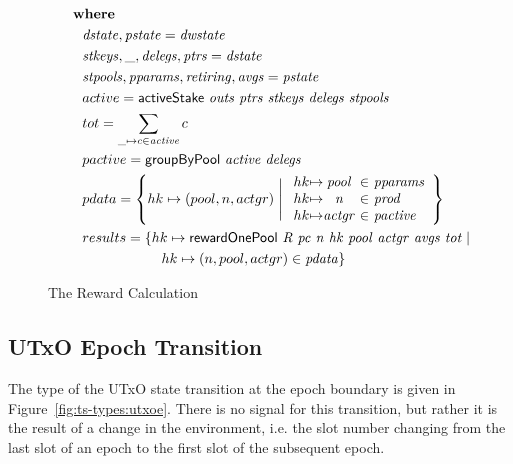 \begin{figure}[htb]
\begin{align*}
      & ~~~\where \\
      & ~~~~~~~\var{dstate},\var{pstate} = \var{dwstate} \\
      & ~~~~~~~\var{stkeys},\_,\var{delegs},\var{ptrs} = \var{dstate} \\
      & ~~~~~~~\var{stpools},\var{pparams},\var{retiring},\var{avgs} = \var{pstate} \\
      & ~~~~~~~active = \activeStake{outs}{ptrs}{stkeys}{delegs}{stpools} \\
      & ~~~~~~~tot = \sum_{\_\mapsto c\in \var{active}}c \\
      & ~~~~~~~pactive = \fun{groupByPool}~\var{active}~\var{delegs} \\
      & ~~~~~~~pdata = \left\{
                         hk\mapsto (pool, n, actgr)  \mathrel{\Bigg|}
                          \begin{array}{r@{\mapsto}c@{~\in~}l}
                          hk & \var{pool} & \var{pparams} \\
                          hk & \var{n} & \var{prod} \\
                          hk & \var{actgr} & \var{pactive} \\
                          \end{array}
                       \right\} \\
      & ~~~~~~~results = \{hk \mapsto \fun{rewardOnePool}~\var{R}~\var{pc}~\var{n}~\var{hk}
      ~\var{pool}~\var{actgr}~\var{avgs}~\var{tot}
                         \mid \\
      &\qquad \qquad \qquad \qquad hk\mapsto(n, pool, actgr)\in\var{pdata} \}
  \end{align*}
  \caption{The Reward Calculation}
  \label{fig:functions:reward-calc}
\end{figure}

\clearpage

\subsection{UTxO Epoch Transition}
\label{sec:utxo-epoch}

The type of the UTxO state transition at the epoch boundary is given in
Figure~\ref{fig:ts-types:utxoe}. There is no signal for this transition, but rather
it is the result of a change in the environment, i.e. the slot number changing
from the last slot of an epoch to the first slot of the subsequent epoch.

